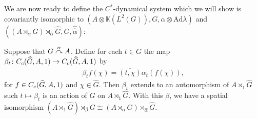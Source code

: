 We are now ready to define the $C^*$-dynamical system which we will show is covariantly isomorphic to $(A \otimes \mathbb{K}(L^2(G)), G, \alpha \otimes \mathrm{Ad} \lambda)$ and $\left( (A \rtimes_\alpha G)\rtimes_{\hat \alpha} \hat G, G, \hat{\hat \alpha} \right)$:
\begin{proposition}
Suppose that $G \stackrel{\alpha}{\curvearrowright} A$. Define for each $t \in G$ the map $\beta_t \colon C_c( \widehat{G}, A, 1) \to C_c(\widehat{G}, A, 1)$ by
\begin{align*}
	\beta_t f(\chi) = \overline{ ( t, \chi)} \alpha_t(f(\chi)),	
\end{align*}
for $f \in C_c(\widehat{G}, A, 1)$ and $\chi \in \hat G$. Then $\beta_t$ extends to an automorphism of $A \rtimes_{1} \hat G$ such $t \mapsto \beta_t$ is an action of $G$ on $A \rtimes_1 \hat G$. With this $\beta$, we have a spatial isomorphism $(A \rtimes_1 \hat G) \rtimes_\beta G \cong (A \rtimes_\alpha G) \rtimes_{\hat \alpha} \hat G$. 
\end{proposition}
